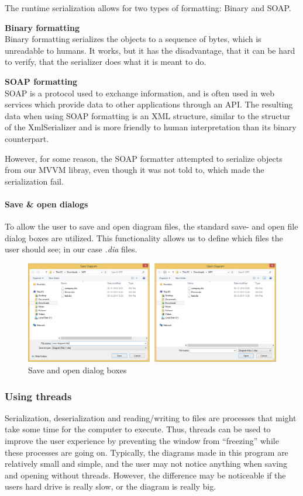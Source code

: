 The runtime serialization allows for two types of formatting: Binary and SOAP.

\textbf{Binary formatting}\\
Binary formatting serializes the objects to a
sequence of bytes, which is unreadable to humans. It works, but it has the
disadvantage, that it can be hard to verify, that the serializer does what it is
meant to do.

\textbf{SOAP formatting}\\
SOAP is a protocol used to exchange information, and
is often used in web services which provide data to other applications through
an API. The resulting data when using SOAP formatting is an XML structure,
similar to the structur of the XmlSerializer and is more friendly to human
interpretation than its binary counterpart.

However, for some reason, the SOAP formatter attempted to serialize objects from
our MVVM libray, even though it was not told to, which made the serialization
fail.

\paragraph{Save \& open dialogs}
To allow the user to save and open diagram files, the standard save- and open 
file dialog boxes are utilized. This functionality allows us to define which 
files the user should see; in our case \emph{.dia} files.

\begin{figure}[H]
	\centering
	\includegraphics[width=\linewidth]{img/save_open.png}
	\caption{Save and open dialog boxes \label{saveopen}}
\end{figure}

\subsubsection{Using threads}
Serialization, deserialization and reading/writing
to files are processes that might take some time for the computer to execute.
Thus, threads can be used to improve the user experience by preventing the
window from “freezing” while these processes are going on. Typically, the
diagrams made in this program are relatively small and simple, and the user may
not notice anything when saving and opening without threads. However, the
difference may be noticeable if the users hard drive is really slow, or the
diagram is really big.

